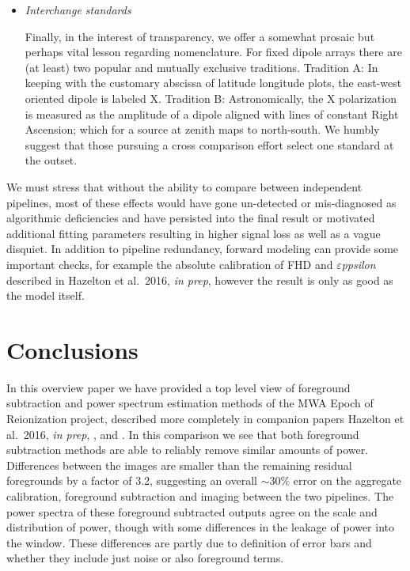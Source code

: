 \documentclass[twolcolumn,iop]{emulateapj}
\def\eppsilon{{\it $\varepsilon$ppsilon}}
\def\chipscite{\cite{2016arXiv160102073T}}
\def\eppsiloncite{Hazelton et al.\ 2016, \emph{in prep}}
\def\dilloncite{\cite{PhysRevD.91.123011} }
\begin{document}
\begin{itemize}
\item \emph{Interchange standards}

Finally, in the interest of transparency, we offer a somewhat prosaic but perhaps vital lesson regarding  nomenclature. For fixed dipole arrays there are (at least) two popular and mutually exclusive traditions. Tradition A: In keeping with the customary abscissa of latitude longitude plots, the east-west oriented dipole is labeled X.  Tradition B: Astronomically, the X polarization is measured as the amplitude of a dipole aligned with lines of constant Right Ascension; which for a source at zenith maps to north-south. We humbly suggest that those pursuing a cross comparison effort select one standard at the outset.  

\end{itemize}






  We must stress that without the ability to compare between independent pipelines, most of these effects would have gone un-detected or mis-diagnosed as algorithmic deficiencies and have persisted into the final result or motivated additional fitting parameters resulting in higher signal loss as well as a vague disquiet. In addition to pipeline redundancy, forward modeling can provide some important checks, for example the absolute calibration of FHD and \eppsilon{} described in \eppsiloncite{}, however the result is only as good as the model itself.
  
\section{Conclusions}
\label{sec:conclusion}
In this overview paper we have provided a top level view of foreground subtraction and power spectrum estimation methods of the MWA Epoch of Reionization project, described more completely in companion papers \eppsiloncite{}, \chipscite{}, and \dilloncite{}.  In this comparison we see that both foreground subtraction methods are able to reliably remove similar amounts of power.  Differences between the images are smaller than the remaining residual foregrounds by a factor of 3.2, suggesting an overall $\sim$30\% error on the aggregate calibration, foreground subtraction and imaging between the two pipelines.  The power spectra of these foreground subtracted outputs agree on the scale and distribution of power, though with some differences in the leakage of power into the window. These differences are partly due to definition of error bars and whether they include just noise or also foreground terms.  
\end{document}
